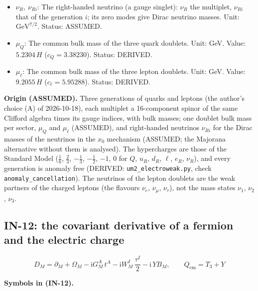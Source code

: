 \documentclass[
  10pt,
]{article}
\begin{document}
\begin{itemize}
  \(e_R,\ e_{Ri}\): The right-handed charged-lepton singlet: \(e_R\) the
  multiplet, \(e_{Ri}\) that of the generation \(i\) (\(e_R\),
  \(\mu_R\), \(\tau_R\)). Unit: \(\mathrm{GeV}^{7/2}\). Status: ASSUMED.
\item
  \(\nu_R,\ \nu_{Ri}\): The right-handed neutrino (a gauge singlet):
  \(\nu_R\) the multiplet, \(\nu_{Ri}\) that of the generation \(i\);
  its zero modes give Dirac neutrino masses. Unit:
  \(\mathrm{GeV}^{7/2}\). Status: ASSUMED.
\item
  \(\mu_Q\): The common bulk mass of the three quark doublets. Unit:
  GeV. Value: \(5.2304\,H\) (\(c_Q = 3.38230\)). Status: DERIVED.
\item
  \(\mu_\ell\): The common bulk mass of the three lepton doublets. Unit:
  GeV. Value: \(9.2055\,H\) (\(c_\ell = 5.95288\)). Status: DERIVED.
\end{itemize}

\textbf{Origin (ASSUMED).} Three generations of quarks and leptons (the
author's choice (A) of 2026-10-18), each multiplet a 16-component spinor
of the same Clifford algebra times its gauge indices, with bulk masses;
one doublet bulk mass per sector, \(\mu_Q\) and \(\mu_\ell\) (ASSUMED),
and right-handed neutrinos \(\nu_{Ri}\) for the Dirac masses of the
neutrinos in the \(x_0\) mechanism (ASSUMED; the Majorana alternative
without them is analysed). The hypercharges are those of the Standard
Model (\(\frac16\), \(\frac23\), \(-\frac13\), \(-\frac12\), \(-1\),
\(0\) for \(Q\), \(u_R\), \(d_R\), \(\ell\), \(e_R\), \(\nu_R\)), and
every generation is anomaly free (DERIVED: \texttt{um2\_electroweak.py},
check \texttt{anomaly\_cancellation}). The neutrinos of the lepton
doublets are the weak partners of the charged leptons (the flavours
\(\nu_e\), \(\nu_\mu\), \(\nu_\tau\)), not the mass states \(\nu_1\),
\(\nu_2\), \(\nu_3\).

\hypertarget{in-12-the-covariant-derivative-of-a-fermion-and-the-electric-charge}{%
\subsection{IN-12: the covariant derivative of a fermion and the
electric
charge}\label{in-12-the-covariant-derivative-of-a-fermion-and-the-electric-charge}}

\[
D_M = \partial_M + \Omega_M - \mathrm{i}G^A_M\,t^A - \mathrm{i}W^I_M\,\frac{\tau^I}{2} - \mathrm{i}\,Y
 B_M,\qquad
Q_{\mathrm{em}} = T_3 + Y \tag{IN-12}
\]

\textbf{Symbols in (IN-12).}
\end{document}
